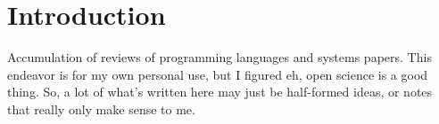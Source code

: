 \chapter {Introduction}

Accumulation of reviews of programming languages and systems papers. This
endeavor is for my own personal use, but I figured eh, open science is a good
thing. So, a lot of what's written here may just be half-formed ideas, or notes
that really only make sense to me.